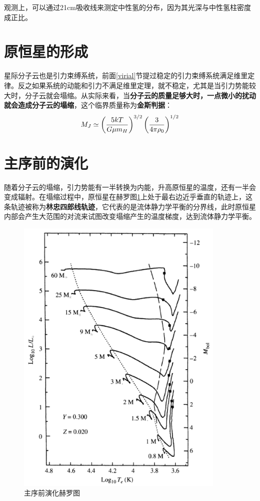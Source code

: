 观测上，可以通过21\;cm吸收线来测定中性氢的分布，因为其光深与中性氢柱密度成正比。

\section{原恒星的形成}
星际分子云也是引力束缚系统，前面\ref{virial}节提过稳定的引力束缚系统满足维里定律。反之如果系统的动能和引力不满足维里定理，就不稳定，尤其是当引力势能较大时，分子云就会塌缩。从实际来看，当\textbf{分子云的质量足够大时，一点微小的扰动就会造成分子云的塌缩}，这个临界质量称为\textbf{金斯判据}：
\begin{equation}
  M_J\simeq\left({5kT\over G\mu m_H}\right)^{3/2}\left({3\over 4\pi \rho_0}\right)^{1/2}
\end{equation}

\section{主序前的演化}
随着分子云的塌缩，引力势能有一半转换为内能，升高原恒星的温度，还有一半会变成辐射。在塌缩过程中，原恒星在赫罗图\ref{fig:hayashi}上处于最右边近乎垂直的轨迹上，这条轨迹被称为\textbf{林忠四郎线轨迹}，它代表的是流体静力学平衡的分界线，此时原恒星内部会产生大范围的对流来试图改变塌缩产生的温度梯度，达到流体静力学平衡。
\begin{figure}[hbt]
  \centering
  \includegraphics[width=10cm]{chapters/12/hayashi}
  \caption{主序前演化赫罗图}
  \label{fig:hayashi}
\end{figure}

